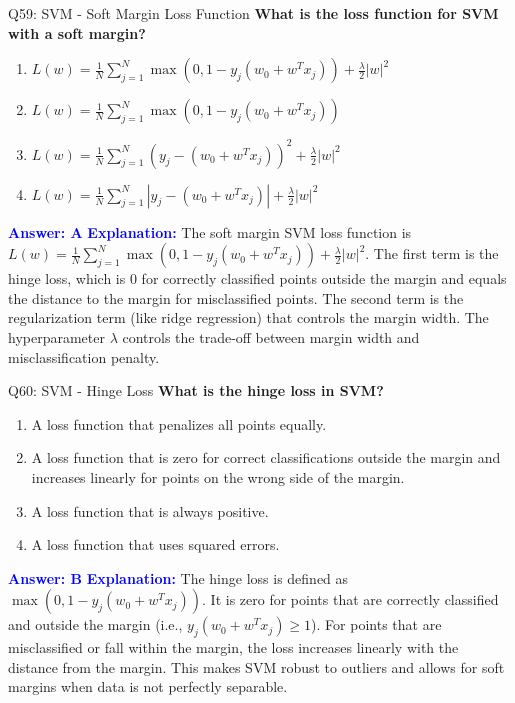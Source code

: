 \documentclass[8pt]{beamer}
\begin{document}
	\begin{frame}{Q59: SVM - Soft Margin Loss Function}
		\fontsize{6.5}{7.5}\selectfont
		\textbf{What is the loss function for SVM with a soft margin?}
		\begin{enumerate}
			\item $L(w) = \frac{1}{N}\sum_{j=1}^N \max(0, 1 - y_j(w_0 + w^T x_j)) + \frac{\lambda}{2}|w|^2$
			\item $L(w) = \frac{1}{N}\sum_{j=1}^N \max(0, 1 - y_j(w_0 + w^T x_j))$
			\item $L(w) = \frac{1}{N}\sum_{j=1}^N (y_j - (w_0 + w^T x_j))^2 + \frac{\lambda}{2}|w|^2$
			\item $L(w) = \frac{1}{N}\sum_{j=1}^N |y_j - (w_0 + w^T x_j)| + \frac{\lambda}{2}|w|^2$
		\end{enumerate}
		\vspace{0.1cm}
		\textcolor{blue}{\textbf{Answer: A}}
		\vspace{0.1cm}
		\textcolor{blue}{\textbf{Explanation:}} The soft margin SVM loss function is $L(w) = \frac{1}{N}\sum_{j=1}^N \max(0, 1 - y_j(w_0 + w^T x_j)) + \frac{\lambda}{2}|w|^2$. The first term is the hinge loss, which is 0 for correctly classified points outside the margin and equals the distance to the margin for misclassified points. The second term is the regularization term (like ridge regression) that controls the margin width. The hyperparameter $\lambda$ controls the trade-off between margin width and misclassification penalty.
	\end{frame}
	
	\begin{frame}{Q60: SVM - Hinge Loss}
		\fontsize{6.5}{7.5}\selectfont
		\textbf{What is the hinge loss in SVM?}
		\begin{enumerate}
			\item A loss function that penalizes all points equally.
			\item A loss function that is zero for correct classifications outside the margin and increases linearly for points on the wrong side of the margin.
			\item A loss function that is always positive.
			\item A loss function that uses squared errors.
		\end{enumerate}
		\vspace{0.1cm}
		\textcolor{blue}{\textbf{Answer: B}}
		\vspace{0.1cm}
		\textcolor{blue}{\textbf{Explanation:}} The hinge loss is defined as $\max(0, 1 - y_j(w_0 + w^T x_j))$. It is zero for points that are correctly classified and outside the margin (i.e., $y_j(w_0 + w^T x_j) \geq 1$). For points that are misclassified or fall within the margin, the loss increases linearly with the distance from the margin. This makes SVM robust to outliers and allows for soft margins when data is not perfectly separable.
	\end{frame}
	
\end{document}
